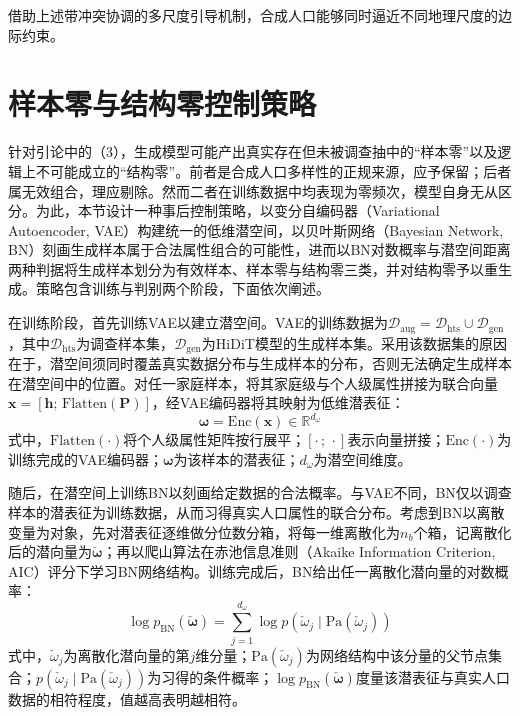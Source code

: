 借助上述带冲突协调的多尺度引导机制，合成人口能够同时逼近不同地理尺度的边际约束。

\section{样本零与结构零控制策略}\label{sec.popsyn.zeros}
 
针对引论中的（3），生成模型可能产出真实存在但未被调查抽中的``样本零''以及逻辑上不可能成立的``结构零''。前者是合成人口多样性的正规来源，应予保留；后者属无效组合，理应剔除。然而二者在训练数据中均表现为零频次，模型自身无从区分。为此，本节设计一种事后控制策略，以变分自编码器（Variational Autoencoder, VAE）\cite{kingmaAutoEncodingVariationalBayes2022}构建统一的低维潜空间，以贝叶斯网络（Bayesian Network, BN）\cite{pearlProbabilisticReasoningIntelligent2014}刻画生成样本属于合法属性组合的可能性，进而以BN对数概率与潜空间距离两种判据将生成样本划分为有效样本、样本零与结构零三类，并对结构零予以重生成。策略包含训练与判别两个阶段，下面依次阐述。
 
在训练阶段，首先训练VAE以建立潜空间。VAE的训练数据为$\mathcal{D}_{\mathrm{aug}} = \mathcal{D}_{\mathrm{hts}} \cup \mathcal{D}_{\mathrm{gen}}$，其中$\mathcal{D}_{\mathrm{hts}}$为调查样本集，$\mathcal{D}_{\mathrm{gen}}$为HiDiT模型的生成样本集。采用该数据集的原因在于，潜空间须同时覆盖真实数据分布与生成样本的分布，否则无法确定生成样本在潜空间中的位置。对任一家庭样本，将其家庭级与个人级属性拼接为联合向量$\mathbf{x} = \left[\mathbf{h};\, \mathrm{Flatten}(\mathbf{P})\right]$，经VAE编码器将其映射为低维潜表征：
\begin{equation}
  \boldsymbol{\omega} = \mathrm{Enc}\left(\mathbf{x}\right) \in \mathbb{R}^{d_{\omega}}
  \label{eq.popsyn.vaeenc}
\end{equation}
式中，$\mathrm{Flatten}(\cdot)$将个人级属性矩阵按行展平；$[\cdot\,;\,\cdot]$表示向量拼接；$\mathrm{Enc}(\cdot)$为训练完成的VAE编码器；$\boldsymbol{\omega}$为该样本的潜表征；$d_{\omega}$为潜空间维度。
 
随后，在潜空间上训练BN以刻画给定数据的合法概率。与VAE不同，BN仅以调查样本的潜表征为训练数据，从而习得真实人口属性的联合分布。考虑到BN以离散变量为对象，先对潜表征逐维做分位数分箱，将每一维离散化为$n_b$个箱，记离散化后的潜向量为$\check{\boldsymbol{\omega}}$；再以爬山算法在赤池信息准则（Akaike Information Criterion, AIC）评分下学习BN网络结构\cite{sunBayesianNetworkApproach2015}。训练完成后，BN给出任一离散化潜向量的对数概率：
\begin{equation}
  \log p_{\mathrm{BN}}\left(\check{\boldsymbol{\omega}}\right) = \sum_{j=1}^{d_{\omega}} \log p\left(\check{\omega}_j \mid \mathrm{Pa}\left(\check{\omega}_j\right)\right)
  \label{eq.popsyn.bnprob}
\end{equation}
式中，$\check{\omega}_j$为离散化潜向量的第$j$维分量；$\mathrm{Pa}(\check{\omega}_j)$为网络结构中该分量的父节点集合；$p(\check{\omega}_j \mid \mathrm{Pa}(\check{\omega}_j))$为习得的条件概率；$\log p_{\mathrm{BN}}(\check{\boldsymbol{\omega}})$度量该潜表征与真实人口数据的相符程度，值越高表明越相符。
 
